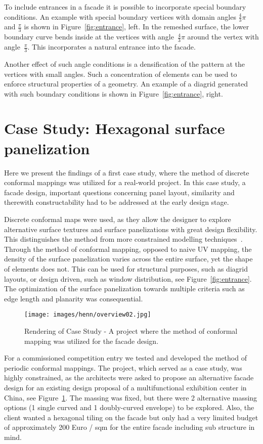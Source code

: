 \documentclass[Thesis.tex]{subfiles}
\begin{document}
To include entrances in a facade it is possible to incorporate special 
boundary conditions. An example with special boundary vertices with domain angles
$\frac{4}{3}\pi$ and $\tfrac{\pi}{3}$ is shown in
Figure~\ref{fig:entrance}, left. In the remeshed surface, the lower boundary
curve bends inside at the vertices with angle~$\tfrac{4}{3}\pi$ around
the vertex with angle~$\tfrac{\pi}{3}$. This incorporates a natural
entrance into the facade.

Another effect of such angle conditions is a densification of the
pattern at the vertices with small angles. Such a concentration of
elements can be used to enforce structural properties of a
geometry. An example of a diagrid generated with such boundary
conditions is shown in Figure~\ref{fig:entrance}, right.


\section{Case Study: Hexagonal surface panelization}
\label{sec:panelization}
Here we present the findings of a first case study, where the method
of discrete conformal mappings was utilized for a real-world project.
In this case study, a facade design, important questions concerning
panel layout, similarity and therewith constructability had to be
addressed at the early design stage.

Discrete conformal maps were used, as they allow the designer to
explore alternative surface textures and surface panelizations with
great design flexibility. This distinguishes the method from more
constrained modelling techniques~\cite{GlymphSCMS2004}. Through the method of
conformal mapping, opposed to naive UV mapping, the density of the
surface panelization varies across the entire surface, yet the shape
of elements does not. This can be used for structural purposes, such
as diagrid layouts, or design driven, such as window distribution, see 
Figure~\ref{fig:entrance}. The optimization of the surface panelization 
towards multiple criteria such as edge length and planarity was 
consequential.

\begin{figure}[t]
  \centering
  \texttt{[image: images/henn/overview02.jpg]}
  \caption{Rendering of Case Study - A project where the method of
    conformal mapping was utilized for the facade design.}
  \label{fig:overview02}
\end{figure}

For a commissioned competition entry we tested and developed the
method of periodic conformal mappings. The project, which served as a
case study, was highly constrained, as the architects were asked to
propose an alternative facade design for an existing design proposal
of a multifunctional exhibition center in China, see
Figure~\ref{fig:overview02}. The massing was fixed, but there were 2
alternative massing options (1 single curved and 1 doubly-curved
envelope) to be explored. Also, the client wanted a hexagonal tiling
on the facade but only had a very limited budget of approximately 200
Euro / sqm for the entire facade including sub structure in mind.
\end{document}
